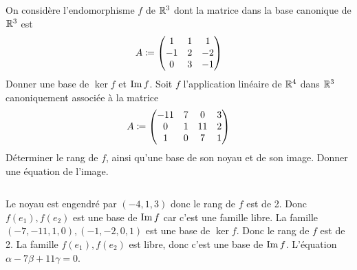 \documentclass{magnolia}
\begin{document}
\begin{questions}
\question On considère l'endomorphisme $f$ de $\mathbb{R}^3$ dont la matrice dans la
  base canonique de $\mathbb{R}^3$ est
  \[A\coloneqq\begin{pmatrix}
      1 & 1 & 1\\
     -1 & 2 & -2\\
      0 & 3 & -1
      \end{pmatrix}\]
  Donner une base de $\ker f$ et $\operatorname{Im} f$.
\question Soit $f$ l'application linéaire de $\mathbb{R}^4$ dans $\mathbb{R}^3$ canoniquement
  associée à la matrice
  \[A\coloneqq\begin{pmatrix}
      -11 & 7 & 0 & 3\\
       0 & 1 & 11 & 2\\
       1 & 0 & 7 & 1
      \end{pmatrix}\]
  Déterminer le rang de $f$, ainsi qu'une base de son noyau et de son image.
  Donner une équation de l'image.
\end{questions}
\begin{sol}
$\quad$
\begin{questions}
\question Le noyau est engendré par $(-4,1,3)$ donc le rang de $f$ est de 2.
  Donc $f(e_1),f(e_2)$ est une base de $\operatorname{Im} f$ car c'est une famille libre.
\question La famille $(-7,-11,1,0),(-1,-2,0,1)$ est une base de $\ker f$.
  Donc le rang de $f$ est de 2. La famille $f(e_1),f(e_2)$ est libre, donc
  c'est une base de $\operatorname{Im} f$. L'équation $\alpha-7\beta+11\gamma=0$.  
\end{questions}
\end{sol}

\end{document}
